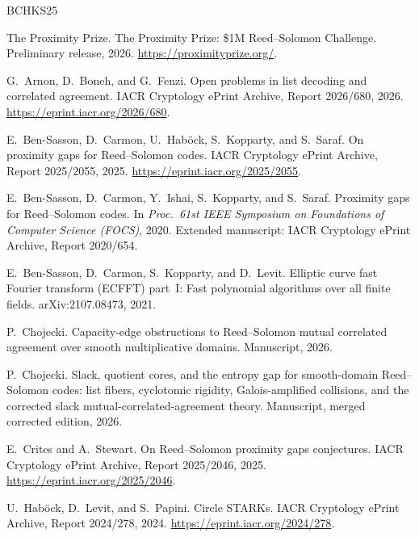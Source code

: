 \documentclass[11pt]{article}
\theoremstyle{definition}
\theoremstyle{remark}
\begin{document}
\begin{thebibliography}{BCHKS25}

The Proximity Prize.
\newblock The Proximity Prize: \$1M Reed--Solomon Challenge.
\newblock Preliminary release, 2026.
\newblock \url{https://proximityprize.org/}.


G.~Arnon, D.~Boneh, and G.~Fenzi.
\newblock Open problems in list decoding and correlated agreement.
\newblock IACR Cryptology ePrint Archive, Report 2026/680, 2026.
\newblock \url{https://eprint.iacr.org/2026/680}.

E.~Ben-Sasson, D.~Carmon, U.~Hab{\"o}ck, S.~Kopparty, and S.~Saraf.
\newblock On proximity gaps for Reed--Solomon codes.
\newblock IACR Cryptology ePrint Archive, Report 2025/2055, 2025.
\newblock \url{https://eprint.iacr.org/2025/2055}.


E.~Ben-Sasson, D.~Carmon, Y.~Ishai, S.~Kopparty, and S.~Saraf.
\newblock Proximity gaps for Reed--Solomon codes.
\newblock In \emph{Proc.\ 61st IEEE Symposium on Foundations of Computer Science (FOCS)}, 2020.
\newblock Extended manuscript: IACR Cryptology ePrint Archive, Report 2020/654.

E.~Ben-Sasson, D.~Carmon, S.~Kopparty, and D.~Levit.
\newblock Elliptic curve fast Fourier transform (ECFFT) part~I: Fast polynomial algorithms over all finite fields.
\newblock arXiv:2107.08473, 2021.

P.~Chojecki.
\newblock Capacity-edge obstructions to Reed--Solomon mutual correlated agreement over smooth multiplicative domains.
\newblock Manuscript, 2026.

P.~Chojecki.
\newblock Slack, quotient cores, and the entropy gap for smooth-domain Reed--Solomon codes: list fibers, cyclotomic rigidity, Galois-amplified collisions, and the corrected slack mutual-correlated-agreement theory.
\newblock Manuscript, merged corrected edition, 2026.

E.~Crites and A.~Stewart.
\newblock On Reed--Solomon proximity gaps conjectures.
\newblock IACR Cryptology ePrint Archive, Report 2025/2046, 2025.
\newblock \url{https://eprint.iacr.org/2025/2046}.

U.~Hab{\"o}ck, D.~Levit, and S.~Papini.
\newblock Circle STARKs.
\newblock IACR Cryptology ePrint Archive, Report 2024/278, 2024.
\newblock \url{https://eprint.iacr.org/2024/278}.

\end{thebibliography}
\end{document}
